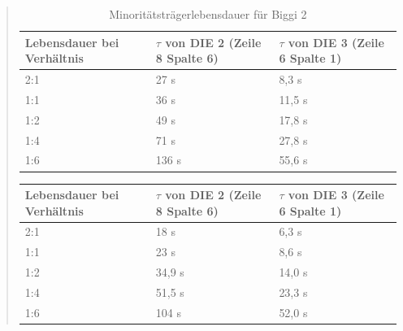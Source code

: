 \begin{quote}
	 \vspace{2em}

      		\begin{table}[H]
     		  \begin{addmargin}[-0.5cm]{3cm}
     			\centering
                   \begin{tabular}{|p{5cm}|p{5cm}|p{5cm}|}
         			\hline
         			Lebensdauer bei Verhältnis &  $\tau$ von DIE 2 (Zeile 8 Spalte 6) & $\tau$ von DIE 3 (Zeile 6 Spalte 1)\\
         			\hline
        			2:1 & 27 \micro s &  8,3 \micro s\\
        			\hline
        			1:1 & 36 \micro s &  11,5 \micro s\\
        			\hline
        			1:2 & 49 \micro s &  17,8 \micro s\\
        			\hline
        			1:4 & 71 \micro s &  27,8 \micro s\\
        			\hline
        			1:6 & 136 \micro s & 55,6 \micro s\\
        			\hline

                    \end{tabular}
              \end{addmargin}
              \caption{Minoritätsträgerlebensdauer für Biggi 2}
              \label{tab:grossetab1}
            \end{table}

     \vspace{2em}

      		\begin{table}[H]
     		  \begin{addmargin}[-0.5cm]{3cm}
     			\centering
                   \begin{tabular}{|p{5cm}|p{5cm}|p{5cm}|}
         			\hline
         			Lebensdauer bei Verhältnis &  $\tau$ von DIE 2 (Zeile 8 Spalte 6) & $\tau$ von DIE 3 (Zeile 6 Spalte 1)\\
         			\hline
        			2:1 & 18 \micro s &  6,3 \micro s\\
        			\hline
        			1:1 & 23 \micro s &  8,6  \micro s\\
        			\hline
        			1:2 & 34,9 \micro s &  14,0 \micro s\\
        			\hline
        			1:4 & 51,5 \micro s &  23,3 \micro s\\
        			\hline
        			1:6 & 104 \micro s & 52,0 \micro s\\
        			\hline


\end{tabular}
\end{addmargin}
\end{table}
\end{quote}
